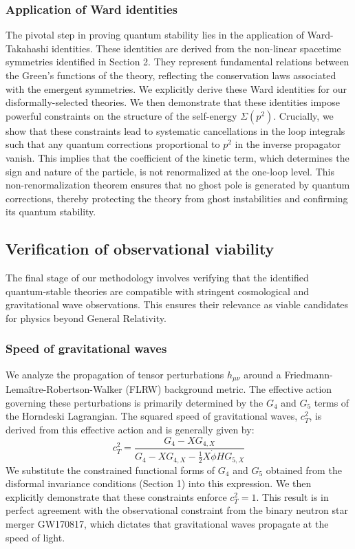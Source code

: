 \documentclass[twocolumn]{aastex631}
\begin{document}
\subsubsection{Application of Ward identities}
The pivotal step in proving quantum stability lies in the application of Ward-Takahashi identities. These identities are derived from the non-linear spacetime symmetries identified in Section 2. They represent fundamental relations between the Green's functions of the theory, reflecting the conservation laws associated with the emergent symmetries. We explicitly derive these Ward identities for our disformally-selected theories. We then demonstrate that these identities impose powerful constraints on the structure of the self-energy $\Sigma(p^2)$. Crucially, we show that these constraints lead to systematic cancellations in the loop integrals such that any quantum corrections proportional to $p^2$ in the inverse propagator vanish. This implies that the coefficient of the kinetic term, which determines the sign and nature of the particle, is not renormalized at the one-loop level. This non-renormalization theorem ensures that no ghost pole is generated by quantum corrections, thereby protecting the theory from ghost instabilities and confirming its quantum stability.

\subsection{Verification of observational viability}
The final stage of our methodology involves verifying that the identified quantum-stable theories are compatible with stringent cosmological and gravitational wave observations. This ensures their relevance as viable candidates for physics beyond General Relativity.

\subsubsection{Speed of gravitational waves}
We analyze the propagation of tensor perturbations $h_{\mu\nu}$ around a Friedmann-Lemaître-Robertson-Walker (FLRW) background metric. The effective action governing these perturbations is primarily determined by the $G_4$ and $G_5$ terms of the Horndeski Lagrangian. The squared speed of gravitational waves, $c_T^2$, is derived from this effective action and is generally given by:
$$ c_T^2 = \frac{G_4 - X G_{4,X}}{G_4 - X G_{4,X} - \frac{1}{2}X\dot{\phi}H G_{5,X}} $$
We substitute the constrained functional forms of $G_4$ and $G_5$ obtained from the disformal invariance conditions (Section 1) into this expression. We then explicitly demonstrate that these constraints enforce $c_T^2 = 1$. This result is in perfect agreement with the observational constraint from the binary neutron star merger GW170817, which dictates that gravitational waves propagate at the speed of light.
\end{document}
